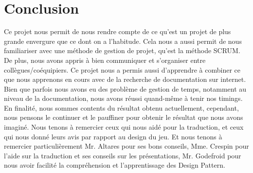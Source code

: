 \section{Conclusion}
Ce projet nous permit de nous rendre compte de ce qu'est un projet de plus grande envergure que ce dont on a l'habitude.
Cela nous a aussi permit de nous familiariser avec une méthode de gestion de projet, qu'est la méthode SCRUM.
De plus, nous avons appris à bien communiquer et s'organiser entre collègues/coéquipiers.
Ce projet nous a permis aussi d'apprendre à combiner ce que nous apprenons en cours avec de la recherche de documentation sur internet.
Bien que parfois nous avons eu des problème de gestion de temps, notamment au niveau de la documentation, nous avons réussi quand-même à tenir nos timings.
En finalité, nous sommes contents du résultat obtenu actuellement, cependant, nous pensons le continuer et le pauffiner pour obtenir le résultat que nous avons imaginé.
Nous tenons à remercier ceux qui nous aidé pour la traduction, et ceux qui nous donné leurs avis par rapport au design du jeu.
Et nous tenons à remercier particulièrement Mr. Altares pour ses bons conseils, Mme. Crespin pour l'aide sur la traduction et ses conseils sur les présentations, Mr. Godefroid pour nous avoir facilité la compréhension et l'apprentissage des Design Pattern.
